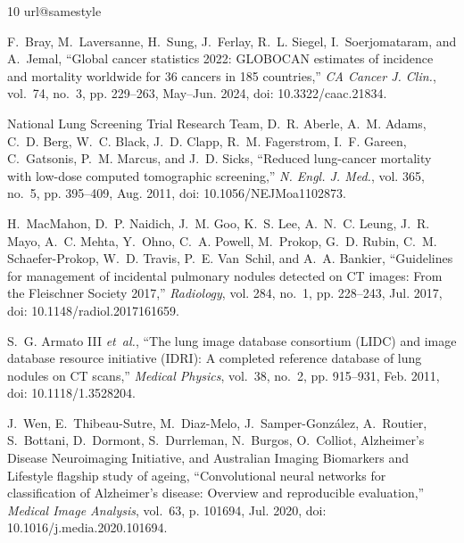 \documentclass{ieeeaccess}
\begin{document}
\begin{thebibliography}{10}
\providecommand{\url}[1]{#1}
\csname url@samestyle\endcsname
\providecommand{\newblock}{\relax}
\providecommand{\bibinfo}[2]{#2}
\providecommand{\BIBentrySTDinterwordspacing}{\spaceskip=0pt\relax}
\providecommand{\BIBentryALTinterwordstretchfactor}{4}
\providecommand{\BIBentryALTinterwordspacing}{\spaceskip=\fontdimen2\font plus
\BIBentryALTinterwordstretchfactor\fontdimen3\font minus \fontdimen4\font\relax}
\providecommand{\BIBforeignlanguage}[2]{{%
\expandafter\ifx\csname l@#1\endcsname\relax
\typeout{** WARNING: IEEEtran.bst: No hyphenation pattern has been}%
\typeout{** loaded for the language `#1'. Using the pattern for}%
\typeout{** the default language instead.}%
\else
\language=\csname l@#1\endcsname
\fi
#2}}
\providecommand{\BIBdecl}{\relax}
\BIBdecl

F.~Bray, M.~Laversanne, H.~Sung, J.~Ferlay, R.~L. Siegel, I.~Soerjomataram, and A.~Jemal, ``Global cancer statistics 2022: {GLOBOCAN} estimates of incidence and mortality worldwide for 36 cancers in 185 countries,'' \emph{CA Cancer J. Clin.}, vol.~74, no.~3, pp. 229--263, May–Jun. 2024, doi: 10.3322/caac.21834.

{National Lung Screening Trial Research Team}, D.~R. Aberle, A.~M. Adams, C.~D. Berg, W.~C. Black, J.~D. Clapp, R.~M. Fagerstrom, I.~F. Gareen, C.~Gatsonis, P.~M. Marcus, and J.~D. Sicks, ``Reduced lung-cancer mortality with low-dose computed tomographic screening,'' \emph{N. Engl. J. Med.}, vol. 365, no.~5, pp. 395--409, Aug. 2011, doi: 10.1056/NEJMoa1102873.

H.~MacMahon, D.~P. Naidich, J.~M. Goo, K.~S. Lee, A.~N.~C. Leung, J.~R. Mayo, A.~C. Mehta, Y.~Ohno, C.~A. Powell, M.~Prokop, G.~D. Rubin, C.~M. Schaefer-Prokop, W.~D. Travis, P.~E. Van~Schil, and A.~A. Bankier, ``Guidelines for management of incidental pulmonary nodules detected on {CT} images: From the {Fleischner Society} 2017,'' \emph{Radiology}, vol. 284, no.~1, pp. 228--243, Jul. 2017, doi: 10.1148/radiol.2017161659.

S.~G. {Armato III} \emph{et~al.}, ``The lung image database consortium ({LIDC}) and image database resource initiative ({IDRI}): A completed reference database of lung nodules on {CT} scans,'' \emph{Medical Physics}, vol.~38, no.~2, pp. 915--931, Feb. 2011, doi: 10.1118/1.3528204.

J.~Wen, E.~Thibeau-Sutre, M.~Diaz-Melo, J.~Samper-Gonz{\'a}lez, A.~Routier, S.~Bottani, D.~Dormont, S.~Durrleman, N.~Burgos, O.~Colliot, {Alzheimer's Disease Neuroimaging Initiative}, and {Australian Imaging Biomarkers and Lifestyle flagship study of ageing}, ``Convolutional neural networks for classification of {A}lzheimer's disease: Overview and reproducible evaluation,'' \emph{Medical Image Analysis}, vol.~63, p. 101694, Jul. 2020, doi: 10.1016/j.media.2020.101694.


\end{thebibliography}
\end{document}
